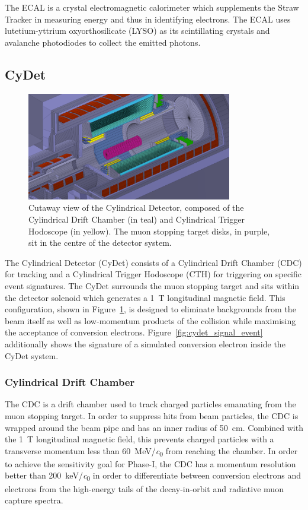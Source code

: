 The ECAL is a crystal electromagnetic calorimeter which supplements the Straw
Tracker in measuring energy and thus in identifying electrons. The ECAL uses
lutetium-yttrium oxyorthosilicate (LYSO) as its scintillating crystals and
avalanche photodiodes to collect the emitted photons.



\subsection{CyDet}

\begin{figure}
    \centering
    \includegraphics[width=0.8\textwidth]{chapter2/cydet_recolor.png}
    \caption{ Cutaway view of the Cylindrical Detector, composed of the
        Cylindrical Drift Chamber (in teal) and Cylindrical Trigger Hodoscope
        (in yellow). The muon stopping target disks, in purple, sit in the
        centre of the detector system. }
    \label{fig:cydet}
\end{figure}

The Cylindrical Detector (CyDet) consists of a Cylindrical Drift Chamber (CDC)
for tracking and a Cylindrical Trigger Hodoscope (CTH) for triggering on
specific event signatures. The CyDet surrounds the muon stopping target and sits
within the detector solenoid which generates a \SI{1}{\tesla} longitudinal
magnetic field. This configuration, shown in Figure~\ref{fig:cydet}, is designed
to eliminate backgrounds from the beam itself as well as low-momentum products
of the collision while maximising the acceptance of conversion electrons.
Figure~\ref{fig:cydet_signal_event} additionally shows the signature of a
simulated conversion electron inside the CyDet system.


\subsubsection{Cylindrical Drift Chamber}
The CDC is a drift chamber used to track charged particles emanating from the
muon stopping target. In order to suppress hits from beam particles, the CDC is
wrapped around the beam pipe and has an inner radius of \SI{50}{\cm}. Combined
with the \SI{1}{\tesla} longitudinal magnetic field, this prevents charged
particles with a transverse momentum less than \SI{60}{\MeV/\clight} from
reaching the chamber. In order to achieve the sensitivity goal for Phase-I, the
CDC has a momentum resolution better than \SI{200}{\keV/\clight} in order to
differentiate between conversion electrons and electrons from the high-energy
tails of the decay-in-orbit and radiative muon capture spectra. 

